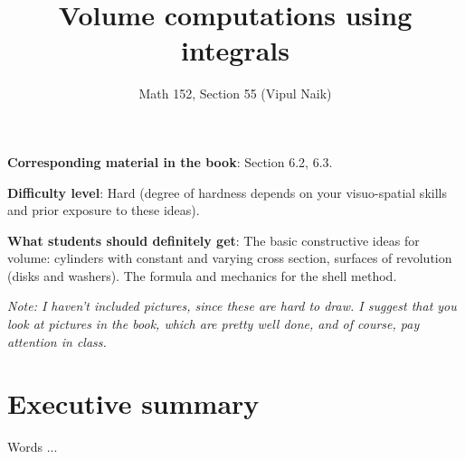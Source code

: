 \documentclass[10pt]{amsart}
\title{Volume computations using integrals}
\author{Math 152, Section 55 (Vipul Naik)}
\begin{document}
\maketitle

{\bf Corresponding material in the book}: Section 6.2, 6.3.

{\bf Difficulty level}: Hard (degree of hardness depends on your
visuo-spatial skills and prior exposure to these ideas).

{\bf What students should definitely get}: The basic constructive
ideas for volume: cylinders with constant and varying cross section,
surfaces of revolution (disks and washers). The formula and mechanics
for the shell method.

{\em Note: I haven't included pictures, since these are hard to
draw. I suggest that you look at pictures in the book, which are
pretty well done, and of course, pay attention in class.}

\section*{Executive summary}

Words ...
\end{document}
